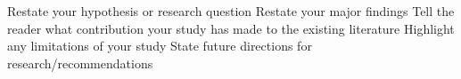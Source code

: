 \documentclass[../thesis.tex]{subfiles}
\begin{document}
    Restate your hypothesis or research question
    Restate your major findings
    Tell the reader what contribution your study has made to the existing literature
    Highlight any limitations of your study
    State future directions for research/recommendations
\end{document}
